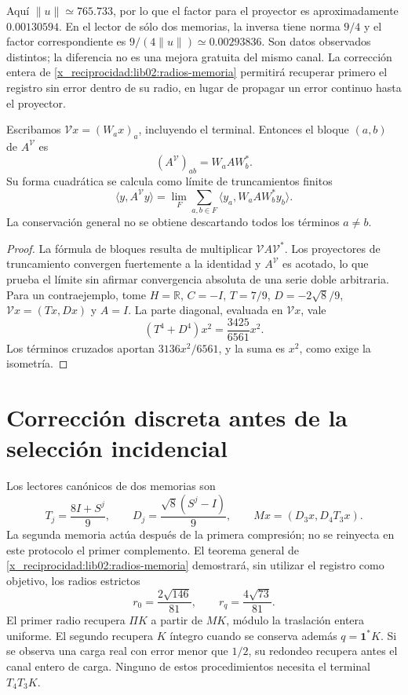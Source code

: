 Aquí \(\|u\|\simeq765.733\), por lo que el factor para el proyector
es aproximadamente \(0.00130594\). En el lector de sólo dos memorias,
la inversa tiene norma \(9/4\) y el factor correspondiente es
\(9/(4\|u\|)\simeq0.00293836\). Son datos observados distintos;
la diferencia no es una mejora gratuita del mismo canal. La corrección
entera de \cref{x_reciprocidad:lib02:radios-memoria} permitirá recuperar primero el
registro sin error dentro de su radio, en lugar de propagar un error
continuo hasta el proyector.

\begin{proposition}
\label{x_reciprocidad:lib01:correlaciones}
Escribamos \(\mathcal Vx=(W_ax)_a\), incluyendo el terminal. Entonces
el bloque \((a,b)\) de \(A^{\mathcal V}\) es
\[
 (A^{\mathcal V})_{ab}=W_aAW_b^*.
\]
Su forma cuadrática se calcula como límite de truncamientos finitos
\[
 \langle y,A^{\mathcal V}y\rangle
 =\lim_F\sum_{a,b\in F}\langle y_a,W_aAW_b^*y_b\rangle.
\]
La conservación general no se obtiene descartando todos los términos
\(a\ne b\).
\end{proposition}
\begin{proof}
La fórmula de bloques resulta de multiplicar \(\mathcal VA\mathcal V^*\).
Los proyectores de truncamiento convergen fuertemente a la identidad y
\(A^{\mathcal V}\) es acotado, lo que prueba el límite sin afirmar
convergencia absoluta de una serie doble arbitraria. Para un
contraejemplo, tome \(H=\mathbb R\), \(C=-I\),
\(T=7/9\), \(D=-2\sqrt8/9\), \(\mathcal Vx=(Tx,Dx)\) y
\(A=I\). La parte diagonal, evaluada en \(\mathcal Vx\), vale
\[
 (T^4+D^4)x^2=\frac{3425}{6561}x^2.
\]
Los términos cruzados aportan \(3136x^2/6561\), y la suma es
\(x^2\), como exige la isometría.
\end{proof}

\section{Corrección discreta antes de la selección incidencial}
\label{x_reciprocidad:lib01:correccion-incidencia}

Los lectores canónicos de dos memorias son
\[
 T_j=\frac{8I+S^j}{9},\qquad
 D_j=\frac{\sqrt8(S^j-I)}9,\qquad
 Mx=(D_3x,D_4T_3x).
\]
La segunda memoria actúa después de la primera compresión; no se reinyecta
en este protocolo el primer complemento. El teorema general de
\cref{x_reciprocidad:lib02:radios-memoria} demostrará, sin utilizar el registro como
objetivo, los radios estrictos
\[
 r_0=\frac{2\sqrt{146}}{81},\qquad
 r_q=\frac{4\sqrt{73}}{81}.
\]
El primer radio recupera \(\Pi K\) a partir de \(MK\), módulo la
traslación entera uniforme. El segundo recupera \(K\) íntegro cuando
se conserva además \(q=\mathbf1^*K\). Si se observa una carga real
con error menor que \(1/2\), su redondeo recupera antes el canal entero
de carga. Ninguno de estos procedimientos necesita el terminal
\(T_4T_3K\).

